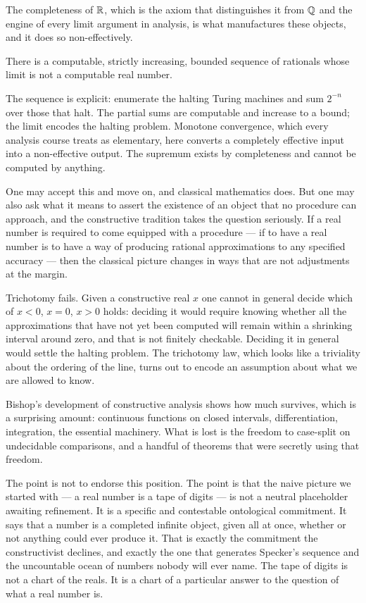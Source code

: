 \documentclass{essay}
\begin{document}
The completeness of \(\mathbb{R}\), which is the axiom that distinguishes it from \(\mathbb{Q}\)
and the engine of every limit argument in analysis, is what manufactures these
objects, and it does so non-effectively.

\begin{theorem}[Specker]
  There is a computable, strictly increasing, bounded sequence of rationals whose
  limit is not a computable real number.
\end{theorem}

The sequence is explicit: enumerate the halting Turing machines and sum
\(2^{-n}\) over those that halt. The partial sums are computable and increase to a
bound; the limit encodes the halting problem. Monotone convergence, which every
analysis course treats as elementary, here converts a completely effective input
into a non-effective output. The supremum exists by completeness and cannot be
computed by anything.

One may accept this and move on, and classical mathematics does. But one may
also ask what it means to assert the existence of an object that no procedure
can approach, and the constructive tradition takes the question seriously. If a
real number is required to come equipped with a procedure --- if to have a real
number is to have a way of producing rational approximations to any specified
accuracy --- then the classical picture changes in ways that are not
adjustments at the margin.

Trichotomy fails. Given a constructive real \(x\) one cannot in general decide
which of \(x < 0\), \(x = 0\), \(x > 0\) holds: deciding it would require knowing
whether all the approximations that have not yet been computed will remain
within a shrinking interval around zero, and that is not finitely checkable.
Deciding it in general would settle the halting problem. The trichotomy law,
which looks like a triviality about the ordering of the line, turns out to
encode an assumption about what we are allowed to know.

Bishop's development of constructive analysis shows how much survives, which is
a surprising amount: continuous functions on closed intervals, differentiation,
integration, the essential machinery. What is lost is the freedom to case-split
on undecidable comparisons, and a handful of theorems that were secretly using
that freedom.

The point is not to endorse this position. The point is that the naive picture
we started with --- a real number is a tape of digits --- is not a neutral
placeholder awaiting refinement. It is a specific and contestable ontological
commitment. It says that a number is a completed infinite object, given all at
once, whether or not anything could ever produce it. That is exactly the
commitment the constructivist declines, and exactly the one that generates
Specker's sequence and the uncountable ocean of numbers nobody will ever name.
The tape of digits is not a chart of the reals. It is a chart of a particular
answer to the question of what a real number is.
\end{document}

